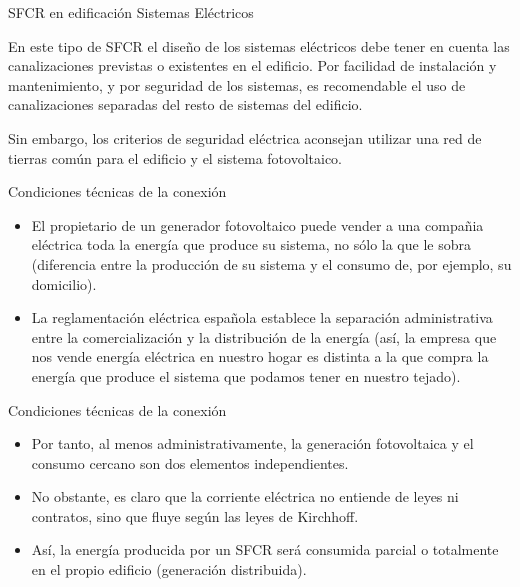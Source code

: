 \documentclass[xcolor={usenames,svgnames,dvipsnames}]{beamer}
\begin{document}
\begin{frame}[label=sec-1-0-18]{SFCR en edificación}
Sistemas Eléctricos

En este tipo de SFCR el diseño de los sistemas eléctricos debe tener en
cuenta las canalizaciones previstas o existentes en el edificio. Por
facilidad de instalación y mantenimiento, y por seguridad de los
sistemas, es recomendable el uso de canalizaciones separadas del resto
de sistemas del edificio.

Sin embargo, los criterios de seguridad eléctrica aconsejan utilizar una
\alert{red de tierras común} para el edificio y el sistema fotovoltaico.
\end{frame}

\begin{frame}[label=sec-1-0-19]{Condiciones técnicas de la conexión}
\begin{itemize}
\item El propietario de un generador fotovoltaico puede vender a una
compañia eléctrica toda la energía que produce su sistema, no sólo la
que le sobra (diferencia entre la producción de su sistema y el
consumo de, por ejemplo, su domicilio).

\item La reglamentación eléctrica española establece la separación
administrativa entre la comercialización y la distribución de la
energía (así, la empresa que nos vende energía eléctrica en nuestro
hogar es distinta a la que compra la energía que produce el sistema
que podamos tener en nuestro tejado).
\end{itemize}
\end{frame}

\begin{frame}[label=sec-1-0-20]{Condiciones técnicas de la conexión}
\begin{itemize}
\item Por tanto, al menos administrativamente, la generación fotovoltaica y
el consumo cercano son dos elementos independientes.

\item No obstante, es claro que la corriente eléctrica no entiende de leyes
ni contratos, sino que fluye según las leyes de Kirchhoff.

\item Así, la energía producida por un SFCR será consumida parcial o
totalmente en el propio edificio (generación distribuida).
\end{itemize}
\end{frame}
\end{document}
